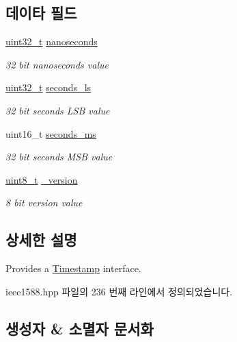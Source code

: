 \subsection*{데이타 필드}
\begin{DoxyCompactItemize}
\item 
\hyperlink{parse_8c_a6eb1e68cc391dd753bc8ce896dbb8315}{uint32\+\_\+t} \hyperlink{class_timestamp_a78ae11d98fcfe738239d0a853d82c84a}{nanoseconds}
\begin{DoxyCompactList}\small\item\em 32 bit nanoseconds value \end{DoxyCompactList}\item 
\hyperlink{parse_8c_a6eb1e68cc391dd753bc8ce896dbb8315}{uint32\+\_\+t} \hyperlink{class_timestamp_a2bf200e58cd268d8b86cf93c51500a44}{seconds\+\_\+ls}
\begin{DoxyCompactList}\small\item\em 32 bit seconds L\+SB value \end{DoxyCompactList}\item 
uint16\+\_\+t \hyperlink{class_timestamp_a5d98378d782519e6f9c17db70f1620f0}{seconds\+\_\+ms}
\begin{DoxyCompactList}\small\item\em 32 bit seconds M\+SB value \end{DoxyCompactList}\item 
\hyperlink{stdint_8h_aba7bc1797add20fe3efdf37ced1182c5}{uint8\+\_\+t} \hyperlink{class_timestamp_a8fab72cfd922b5757580642c2309e9bd}{\+\_\+version}
\begin{DoxyCompactList}\small\item\em 8 bit version value \end{DoxyCompactList}\end{DoxyCompactItemize}


\subsection{상세한 설명}
Provides a \hyperlink{class_timestamp}{Timestamp} interface. 

ieee1588.\+hpp 파일의 236 번째 라인에서 정의되었습니다.



\subsection{생성자 \& 소멸자 문서화}
